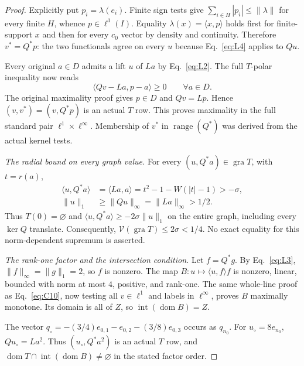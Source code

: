\documentclass[11pt]{article}
\newcommand{\gra}{\operatorname{gra}}
\newcommand{\dom}{\operatorname{dom}}
\newcommand{\pair}[2]{\langle #1,#2\rangle}
\begin{document}
\begin{proof}
Explicitly put $p_i=\lambda(e_i)$. Finite sign tests give
$\sum_{i\in H}|p_i|\le\|\lambda\|$ for every finite $H$, whence
$p\in\ell^1(I)$. Equality $\lambda(x)=\pair{x}{p}$ holds first for
finite-support $x$ and then for every $c_0$ vector by density and continuity.
Therefore $v^*=Q^*p$: the two functionals agree on every $u$ because
Eq.~\eqref{eq:L4} applies to $Qu$.

Every original $a\in D$ admits a lift $u$ of $La$ by Eq.~\eqref{eq:L2}.
The full $T$-polar inequality now reads
\begin{equation}
\pair{Qv-La}{p-a}\ge0\qquad\forall a\in D.
\tag{L5}\label{eq:L5}
\end{equation}
The original maximality proof gives $p\in D$ and $Qv=Lp$. Hence
$(v,v^*)=(v,Q^*p)$ is an actual $T$ row. This proves maximality in the
full standard pair $\ell^1\times\ell^\infty$. Membership of $v^*$ in
$\operatorname{range}(Q^*)$ was derived from the actual kernel tests.

\noindent\textit{The radial bound on every graph value.}
\label{sec:L3}
For every $(u,Q^*a)\in\gra T$, with $t=r(a)$,
\begin{equation}
\begin{aligned}
\pair{u}{Q^*a}&=\pair{La}{a}
 =t^2-1-W(|t|-1)>-\sigma,\\
\|u\|_1&\ge\|Qu\|_\infty=\|La\|_\infty>1/2.
\end{aligned}
\tag{L6}\label{eq:L6}
\end{equation}
Thus $T(0)=\varnothing$ and $\pair{u}{Q^*a}\ge-2\sigma\|u\|_1$ on
the entire graph, including every $\ker Q$ translate. Consequently,
$\mathcal V(\gra T)\le2\sigma<1/4$. No exact equality for this
norm-dependent supremum is asserted.

\noindent\textit{The rank-one factor and the intersection condition.}
\label{sec:L4}
Let $f=Q^*g$. By Eq.~\eqref{eq:L3}, $\|f\|_\infty=\|g\|_1=2$, so $f$
is nonzero. The map $B:u\mapsto\pair{u}{f}f$ is nonzero, linear, bounded
with norm at most $4$, positive, and rank-one. The same whole-line proof
as Eq.~\eqref{eq:C10}, now testing all $v\in\ell^1$ and labels in
$\ell^\infty$, proves $B$ maximally monotone.
Its domain is all of $Z$, so $\operatorname{int}(\dom B)=Z$.

The vector $q_\circ=-(3/4)e_{0,1}-e_{0,2}-(3/8)e_{0,3}$ occurs as
$q_{n_0}$. For $u_\circ=8e_{n_0}$, $Qu_\circ=La^2$.
Thus $(u_\circ,Q^*a^2)$ is an actual $T$ row, and
$\dom T\cap\operatorname{int}(\dom B)\ne\varnothing$ in the stated
factor order.


\end{proof}
\end{document}
